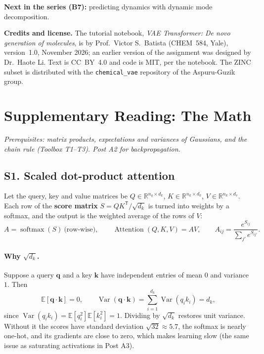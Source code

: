 \documentclass[11pt]{article}
\newcommand{\T}{\mathsf{T}}
\newcommand{\E}{\mathbb{E}}
\newcommand{\R}{\mathbb{R}}
\DeclareMathOperator{\softmax}{softmax}
\DeclareMathOperator{\Var}{Var}
\begin{document}
\textbf{Next in the series (B7):} predicting dynamics with dynamic mode decomposition.

\vspace{0.5em}
{\footnotesize\textbf{Credits and license.} The tutorial notebook, \textit{VAE Transformer: De novo generation of molecules}, is by Prof.\ Victor S.\ Batista (CHEM~584, Yale), version~1.0, November 2026; an earlier version of the assignment was designed by Dr.\ Haote Li. Text is CC~BY~4.0 and code is MIT, per the notebook. The ZINC subset is distributed with the \texttt{chemical\_vae} repository of the Aspuru-Guzik group.}

\clearpage
\section*{Supplementary Reading: The Math}
\textit{Prerequisites: matrix products, expectations and variances of Gaussians, and the chain rule (Toolbox T1--T3). Post A2 for backpropagation.}

\label{sec:S1}
\subsection*{S1. Scaled dot-product attention}
Let the query, key and value matrices be $Q\in\R^{n_q\times d_k}$, $K\in\R^{n_k\times d_k}$, $V\in\R^{n_k\times d_v}$. Each row of the \textbf{score matrix} $S=QK^{\T}/\sqrt{d_k}$ is turned into weights by a softmax, and the output is the weighted average of the rows of $V$:
\[
  A=\softmax(S)\ \text{(row-wise)},\qquad \operatorname{Attention}(Q,K,V)=AV,\qquad A_{ij}=\frac{e^{S_{ij}}}{\sum_{j'}e^{S_{ij'}}} .
\]

\paragraph{Why $\sqrt{d_k}$.} Suppose a query $\bm q$ and a key $\bm k$ have independent entries of mean $0$ and variance $1$. Then
\[
  \E[\bm q\cdot\bm k]=0,\qquad
  \Var(\bm q\cdot\bm k)=\sum_{i=1}^{d_k}\Var(q_ik_i)=d_k ,
\]
since $\Var(q_ik_i)=\E[q_i^2]\E[k_i^2]=1$. Dividing by $\sqrt{d_k}$ restores unit variance. Without it the scores have standard deviation $\sqrt{32}\approx5.7$, the softmax is nearly one-hot, and its gradients are close to zero, which makes learning slow (the same issue as saturating activations in Post A3).
\end{document}
